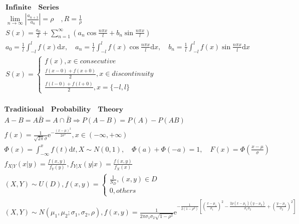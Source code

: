 \documentclass{article}
\begin{document}
\begin{align*}
    \bm{Infinite \quad Series} \\ 
    \lim_{n \to \infty} |\frac{a_{n+1}}{a_{n}}| = \rho \quad, R = \frac{1}{\rho} \\ 
    S(x) = \frac{a_{0}}{2} + \sum_{n=1}^{\infty}(a_{n}\cos{\frac{n\pi x}{l}} + b_{n}\sin{\frac{n\pi x}{l}}) \\ 
    a_{0} = \frac{1}{l}\int_{-l}^{l}f(x)\mathrm{d}x ,\quad a_{n} = \frac{1}{l}\int_{-l}^{l}f(x)\cos{\frac{n\pi x}{l}}\mathrm{d}x ,\quad b_{n} = \frac{1}{l}\int_{-l}^{l}f(x)\sin{\frac{n\pi x}{l}}\mathrm{d}x \\ 
    S(x) = \left\{ 
    \begin{array}{rl} 
        f(x),x \in consecutive \\ 
        \frac{f(x-0)+f(x+0)}{2},x \in discontinuity \\ 
        \frac{f(l-0)+f(l+0)}{2},x = \{-l,l\}
    \end{array} \right. \ \\ 
\end{align*}


\begin{align*}
    \bm{Traditional \quad Probability \quad Theory} \\ 
    A - B = A\bar{B} = A \cap \bar{B} \Rightarrow P(A-B) = P(A) - P(AB) \\ 
    f(x) = \frac{1}{\sqrt{2\pi}\sigma}\mathrm{e}^{-\frac{(x-\mu)^2}{2\sigma^2}} , x \in (-\infty,+\infty)  \\ 
    \Phi(x) = \int_{-\infty}^{x} f(t) \mathrm{d}t , X \sim N(0,1) ,\quad \Phi(a)+\Phi(-a) = 1, \quad F(x) = \Phi(\frac{x-\mu}{\sigma}) \\ 
    f_{X|Y}(x|y) = \frac{f(x,y)}{f_{Y}(y)}, f_{Y|X}(y|x) = \frac{f(x,y)}{f_{X}(x)}\\ 
    (X,Y) \sim U(D), 
    f(x,y) = \left\{ 
    \begin{array}{rl} 
        \frac{1}{S_{D}}, (x,y) \in D\\ 
        0, others
    \end{array} \right. \ \\ 
    (X,Y) \sim N(\mu_{1},\mu_{2};\sigma_{1},\sigma_{2},\rho),f(x,y) = \frac{1}{2\pi \sigma_{1} \sigma_{2} \sqrt{1-\rho^2}} \mathrm{e}^{-\frac{1}{2(1-\rho^2)}[(\frac{x-\mu_{1}}{\sigma_{1}})^2-\frac{2\rho (x-\mu_{1})(y-\mu_{2})}{\sigma_{1}\sigma_{2}}+(\frac{y-\mu_{2}}{\sigma_{2}})^2]} \\
\end{align*}
\end{document}
